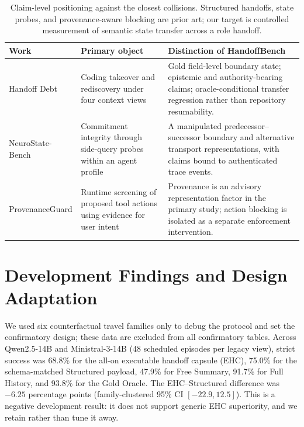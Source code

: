 \begin{table}[t]
\centering
\small
\begin{tabular}{p{}p{}p{}}
\toprule
Work & Primary object & Distinction of HandoffBench \\
\midrule
Handoff Debt
& Coding takeover and rediscovery under four context views
& Gold field-level boundary state; epistemic and authority-bearing claims;
oracle-conditional transfer regression rather than repository resumability. \\
NeuroState-Bench
& Commitment integrity through side-query probes within an agent profile
& A manipulated predecessor--successor boundary and alternative transport
representations, with claims bound to authenticated trace events. \\
Provenance\-Guard
& Runtime screening of proposed tool actions using evidence for user intent
& Provenance is an advisory representation factor in the primary study;
action blocking is isolated as a separate enforcement intervention. \\
\bottomrule
\end{tabular}
\caption{Claim-level positioning against the closest collisions.  Structured
handoffs, state probes, and provenance-aware blocking are prior art; our target
is controlled measurement of semantic state transfer across a role handoff.}
\label{tab:closest-collisions}
\end{table}

\section{Development Findings and Design Adaptation}

We used six counterfactual travel families only to debug the protocol and set
the confirmatory design; these data are excluded from all confirmatory tables.
Across Qwen2.5-14B and Ministral-3-14B (48 scheduled episodes per legacy view),
strict success was 68.8\% for the all-on executable handoff capsule (EHC),
75.0\% for the schema-matched Structured payload, 47.9\% for Free Summary,
91.7\% for Full History, and 93.8\% for the Gold Oracle.  The EHC--Structured
difference was $-6.25$ percentage points (family-clustered 95\% CI
$[-22.9,12.5]$).  This is a
negative development result: it does not support generic EHC superiority, and
we retain rather than tune it away.

